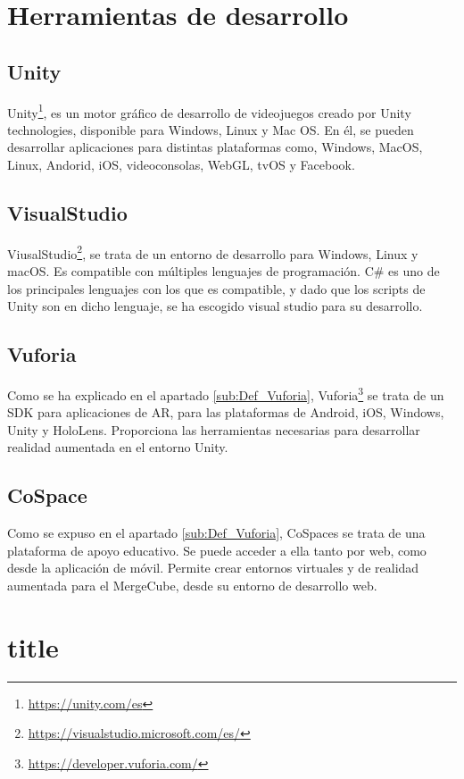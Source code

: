 \section{Herramientas de desarrollo}
\subsection{Unity}
Unity\footnote{\url{https://unity.com/es}}, es un motor gráfico de desarrollo de videojuegos creado por Unity technologies, disponible para Windows, Linux y Mac OS. En él, se pueden desarrollar aplicaciones para distintas plataformas como, Windows, MacOS, Linux, Andorid, iOS, videoconsolas, WebGL, tvOS y Facebook.
\subsection{VisualStudio}
ViusalStudio\footnote{\url{https://visualstudio.microsoft.com/es/}}, se trata de un entorno de desarrollo para Windows, Linux y macOS. Es compatible con múltiples lenguajes de programación. C\# es uno de los principales lenguajes con los que es compatible, y dado que los scripts de Unity son en dicho lenguaje, se ha escogido visual studio para su desarrollo.

\subsection{Vuforia}
Como se ha explicado en el apartado \ref{sub:Def_Vuforia}, Vuforia\footnote{\url{https://developer.vuforia.com/}} se trata de un SDK para aplicaciones de AR, para las plataformas de Android, iOS, Windows, Unity y HoloLens. Proporciona las herramientas necesarias para desarrollar realidad aumentada en el entorno Unity.
\subsection{CoSpace}
Como se expuso en el apartado \ref{sub:Def_Vuforia}, CoSpaces se trata de una plataforma de apoyo educativo. Se puede acceder a ella tanto por web, como desde la aplicación de móvil. Permite crear entornos virtuales y de realidad aumentada para el MergeCube, desde su entorno de desarrollo web.

\section{title}
